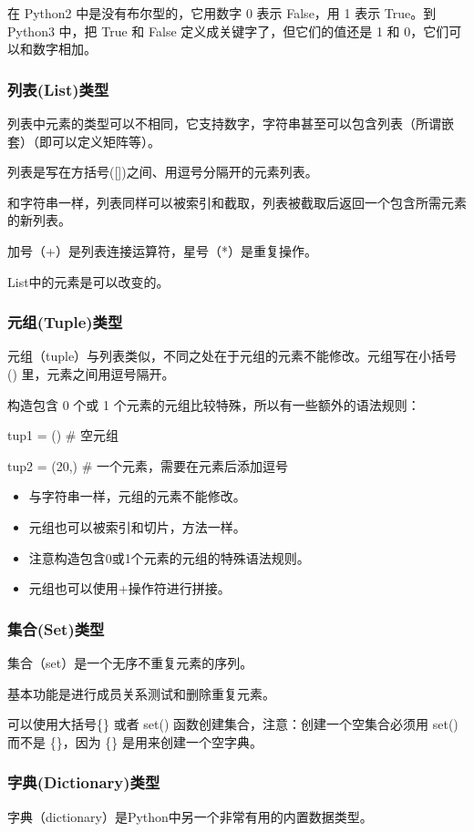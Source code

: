 \documentclass{article}
\begin{document}
在 Python2 中是没有布尔型的，它用数字 0 表示 False，用 1 表示 True。到 Python3 中，把 True 和 False 定义成关键字了，但它们的值还是 1 和 0，它们可以和数字相加。

\subsubsection{列表(List)类型}
列表中元素的类型可以不相同，它支持数字，字符串甚至可以包含列表（所谓嵌套）（即可以定义矩阵等）。

列表是写在方括号([])之间、用逗号分隔开的元素列表。

和字符串一样，列表同样可以被索引和截取，列表被截取后返回一个包含所需元素的新列表。 

加号（+）是列表连接运算符，星号（*）是重复操作。

List中的元素是可以改变的。

\subsubsection{元组(Tuple)类型}
元组（tuple）与列表类似，不同之处在于元组的元素不能修改。元组写在小括号 () 里，元素之间用逗号隔开。 

 构造包含 0 个或 1 个元素的元组比较特殊，所以有一些额外的语法规则：

tup1 = ()    \# 空元组

tup2 = (20,) \# 一个元素，需要在元素后添加逗号

\begin{itemize}
\item 与字符串一样，元组的元素不能修改。
\item 元组也可以被索引和切片，方法一样。
\item 注意构造包含0或1个元素的元组的特殊语法规则。
\item 元组也可以使用+操作符进行拼接。
\end{itemize}

\subsubsection{集合(Set)类型}
集合（set）是一个无序不重复元素的序列。

基本功能是进行成员关系测试和删除重复元素。

可以使用大括号\{\} 或者 set() 函数创建集合，注意：创建一个空集合必须用 set() 而不是 \{\}，因为 \{\} 是用来创建一个空字典。 
\subsubsection{字典(Dictionary)类型}
字典（dictionary）是Python中另一个非常有用的内置数据类型。
\end{document}
